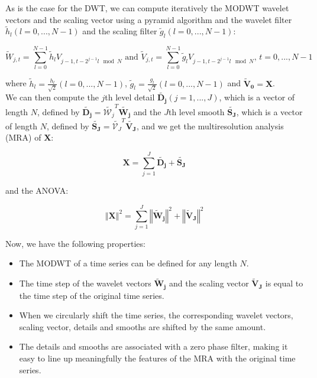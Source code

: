 \documentclass[main.tex]{subfiles}
\begin{document}
As is the case for the DWT, we can compute iteratively the MODWT wavelet vectors and the scaling vector using a pyramid algorithm and the wavelet filter $\widetilde{h}_l \left( l = 0 , ... , N - 1 \right)$ and the scaling filter $\widetilde{g}_l \left( l = 0 , ... , N - 1 \right)$:

\begin{equation}
\widetilde{W}_{j , t} = \sum_{l = 0}^{N - 1} \widetilde{h}_l V_{j - 1 , t - 2^{j - 1} l \mod N} \text{ and } \widetilde{V}_{j , t} = \sum_{l = 0}^{N - 1} \widetilde{g}_l V_{j - 1 , t - 2^{j - 1} l \mod N} \text{, } t = 0 , ... , N - 1
\end{equation}

where $\widetilde{h}_l = \frac{h_l}{\sqrt{2}} \left( l = 0 , ... , N - 1 \right)$,  $\widetilde{g}_l = \frac{g_l}{\sqrt{2}} \left( l = 0 , ... , N - 1 \right)$ and $\bm{\widetilde{V}_0} = \bm{X}$. \\

We can then compute the $j$th level detail $\bm{\widetilde{D_j}} \left( j = 1 , ... , J \right)$, which is a vector of length $N$, defined by $\bm{\widetilde{D_j}} = \widetilde{\mathcal{W}_j}^T \bm{\widetilde{W_j}}$ and the $J$th level smooth $\bm{\widetilde{S_J}}$, which is a vector of length $N$, defined by $\bm{\widetilde{S_J}} = \widetilde{\mathcal{V}_J}^T \bm{\widetilde{V_J}}$, and we get the multiresolution analysis (MRA) of $\bm{X}$:

\begin{equation}
\bm{X} = \sum_{j = 1}^{J} \bm{\widetilde{D_j}} + \bm{\widetilde{S_J}}
\end{equation}

and the ANOVA:

\begin{equation}
\left\Vert \bm{X} \right\Vert ^2 = \sum_{j = 1}^{J} \left\Vert \bm{\widetilde{W}_j} \right\Vert ^2 + \left\Vert \bm{\widetilde{V}_J} \right\Vert ^2
\end{equation}

Now, we have the following properties:

\begin{itemize}
	\item The MODWT of a time series can be defined for any length $N$.
	\item The time step of the wavelet vectors $\bm{\widetilde{W}_j}$ and the scaling vector $\bm{\widetilde{V}_J}$ is equal to the time step of the original time series.
	\item When we circularly shift the time series, the corresponding wavelet vectors, scaling vector, details and smooths are shifted by the same amount.
	\item The details and smooths are associated with a zero phase filter, making it easy to line up meaningfully the features of the MRA with the original time series.
\end{itemize}
\end{document}
